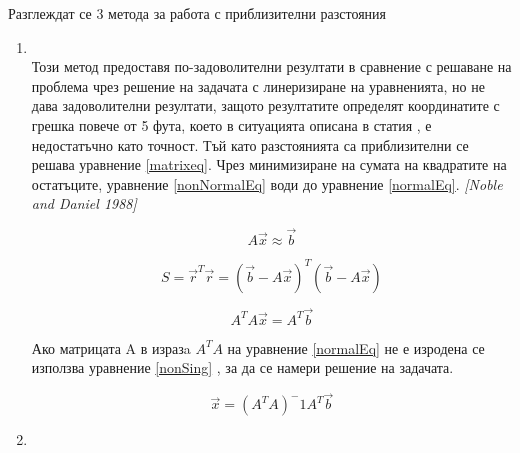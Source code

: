 Разглеждат се 3 метода за работа с приблизителни разстояния

\begin{enumerate}
    \item {} \\ Този метод предоставя по-задоволителни резултати в сравнение с решаване на проблема чрез решение на задачата с линеризиране на уравненията, но не дава задоволителни резултати, защото резултатите определят координатите с  грешка повече от 5 фута, което в ситуацията описана в статия \cite{murphy}, е недостатъчно като точност. Тъй като разстоянията са приблизителни се решава уравнение \ref{matrixeq}. Чрез минимизиране на сумата на квадратите на остатъците, уравнение \ref{nonNormalEq} води до уравнение \ref{normalEq}. \textit{[Noble and Daniel 1988]}
    
    \begin{equation} \label{matrixeq}
      A \vec{x} \approx \vec{b} 
    \end{equation}
    
    \begin{equation} \label{nonNormalEq}
        S = \vec{r}^T \vec{r} = (\vec{b} - A \vec{x})^T ( \vec{b} - A \vec{x})
    \end{equation}
    
    \begin{equation} \label{normalEq}
        A^T A \vec{x} = A^T \vec{b}
    \end{equation}
    
        
    Ако матрицата A в изразa $A^T A$ на уравнение \ref{normalEq} не е изродена се използва уравнение \ref{nonSing} , за да се намери решение на задачата.

    \begin{equation} \label{nonSing}
        \vec{x} = (A^T A)^-1 A^T \vec{b}
    \end{equation}
    
    \item
    
\end{enumerate}

